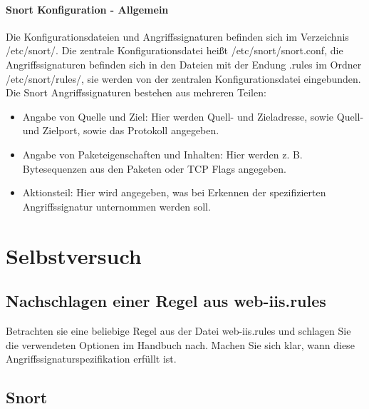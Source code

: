 \documentclass[a4paper]{report}
\begin{document}
\subsubsection{Snort Konfiguration - Allgemein}
Die Konfigurationsdateien und Angriffssignaturen befinden sich im Verzeichnis /etc/snort/. Die zentrale Konfigurationsdatei heißt /etc/snort/snort.conf, die
Angriffssignaturen befinden sich in den Dateien mit der Endung .rules im Ordner
/etc/snort/rules/, sie werden von der zentralen Konfigurationsdatei eingebunden.
Die Snort Angriffssignaturen bestehen aus mehreren Teilen:
\begin{itemize}
\item Angabe von Quelle und Ziel:
Hier werden Quell- und Zieladresse, sowie Quell- und Zielport, sowie das Protokoll
angegeben.
\item Angabe von Paketeigenschaften und Inhalten:
Hier werden z. B. Bytesequenzen aus den Paketen oder TCP Flags angegeben.
\item Aktionsteil:
Hier wird angegeben, was bei Erkennen der spezifizierten Angriffssignatur
unternommen werden soll.
\end{itemize}

\chapter{Selbstversuch}

\section{Nachschlagen einer Regel aus web-iis.rules}
Betrachten sie eine beliebige Regel aus der Datei web-iis.rules und schlagen Sie die
verwendeten Optionen im Handbuch nach. Machen Sie sich klar, wann diese
Angriffssignaturspezifikation erfüllt ist.


\section{Snort}
\end{document}
